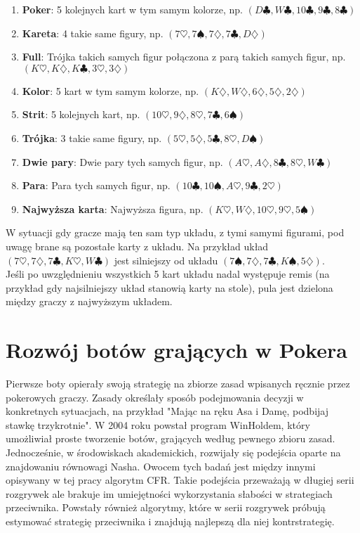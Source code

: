 \documentclass[licencjacka]{pracamgr}
\begin{document}
\begin{enumerate}
\item \textbf{Poker}: 5 kolejnych kart w tym samym kolorze, np. $(D\clubsuit, W\clubsuit, 10\clubsuit, 9\clubsuit, 8\clubsuit)$ 
\item \textbf{Kareta}: 4 takie same figury, np. $(7\heartsuit, 7\spadesuit, 7\diamondsuit, 7\clubsuit, D\diamondsuit)$
\item \textbf{Full}: Trójka takich samych figur połączona z parą takich samych figur, np. $(K\heartsuit, K\diamondsuit, K\clubsuit, 3\heartsuit, 3\diamondsuit)$ 
\item \textbf{Kolor}: 5 kart w tym samym kolorze, np. $(K\diamondsuit, W\diamondsuit, 6\diamondsuit, 5\diamondsuit, 2\diamondsuit)$
\item \textbf{Strit}: 5 kolejnych kart, np. $(10\heartsuit, 9\diamondsuit, 8\heartsuit, 7\clubsuit, 6\spadesuit)$
\item \textbf{Trójka}: 3 takie same figury, np. $(5\heartsuit, 5\diamondsuit, 5\clubsuit, 8\heartsuit, D\spadesuit)$
\item \textbf{Dwie pary}: Dwie pary tych samych figur, np. $(A\heartsuit, A\diamondsuit, 8\clubsuit, 8\heartsuit, W\clubsuit)$
\item \textbf{Para}: Para tych samych figur, np. $(10\clubsuit, 10\spadesuit, A\heartsuit, 9\clubsuit, 2\heartsuit)$
\item \textbf{Najwyższa karta}: Najwyższa figura, np. $(K\heartsuit, W\diamondsuit, 10\heartsuit, 9\heartsuit, 5\spadesuit)$
\end{enumerate}

\noindent
W sytuacji gdy gracze mają ten sam typ układu, z tymi samymi figurami, pod uwagę brane są pozostałe karty z układu. Na przykład
układ $(7\heartsuit, 7\diamondsuit, 7\clubsuit, K\heartsuit, W\clubsuit)$ jest silniejszy od układu
$(7\spadesuit, 7\diamondsuit, 7\clubsuit, K\spadesuit, 5\diamondsuit)$. \\

\noindent
Jeśli po uwzględnieniu wszystkich 5 kart układu nadal występuje remis (na przykład gdy najsilniejszy układ stanowią karty na stole),
pula jest dzielona między graczy z najwyższym układem.

\section{Rozwój botów grających w Pokera}

Pierwsze boty opierały swoją strategię na zbiorze zasad wpisanych ręcznie przez pokerowych graczy. Zasady określały
sposób podejmowania decyzji w konkretnych sytuacjach, na przykład "Mając na ręku Asa i Damę, podbijaj stawkę trzykrotnie".
W 2004 roku powstał program WinHoldem, który umożliwiał proste tworzenie botów, grających według pewnego zbioru zasad.
Jednocześnie, w środowiskach akademickich, rozwijały się podejścia oparte na znajdowaniu równowagi Nasha. Owocem tych
badań jest między innymi opisywany w tej pracy algorytm CFR. Takie podejścia przeważają w długiej serii rozgrywek ale
brakuje im umiejętności wykorzystania słabości w strategiach przeciwnika. Powstały również algorytmy, które w serii
rozgrywek próbują estymować strategię przeciwnika i znajdują najlepszą dla niej kontrstrategię. \cite{exploit}
\end{document}
